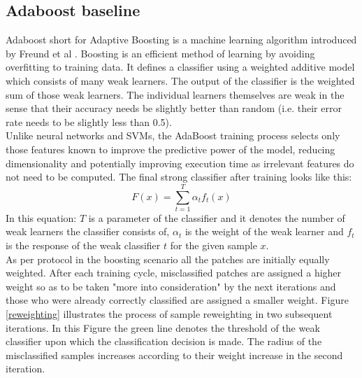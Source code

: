 \documentclass[11pt]{article}
\begin{document}
\subsection{Adaboost baseline}
Adaboost short for Adaptive Boosting is a machine learning algorithm introduced by Freund et al \cite{Freund99ashort}. Boosting is an efficient method of learning by avoiding overfitting to training data. It defines a classifier using a weighted additive model which consists of many weak learners. The output of the classifier is the weighted sum of those weak learners. The individual learners themselves are weak in the sense that their accuracy needs be slightly better than random (i.e. their error rate needs to be slightly less than 0.5).\\
Unlike neural networks and SVMs, the AdaBoost training process selects only those features known to improve the predictive power of the model, reducing dimensionality and potentially improving execution time as irrelevant features do not need to be computed. The final strong classifier after training looks like this:
\[ 
F(x) = \sum_{t=1}^{T} \alpha_t f_t(x)
\]
In this equation: $T$ is a parameter of the classifier and it denotes the number of weak learners the classifier consists of, $\alpha_t$ is the weight of the weak learner and $f_t$ is the response of the weak classifier $t$ for the given sample $x$.\\
As per protocol in the boosting scenario all the patches are initially equally weighted. After each training cycle, misclassified patches are assigned a higher weight so as to be taken "more into consideration" by the next iterations and those who were already correctly classified are assigned a smaller weight. Figure \ref{reweighting} illustrates the process of sample reweighting in two subsequent iterations. In this Figure the green line denotes the threshold of the weak classifier upon which the classification decision is made. The radius of the misclassified samples increases according to their weight increase in the second iteration. 
\end{document}
